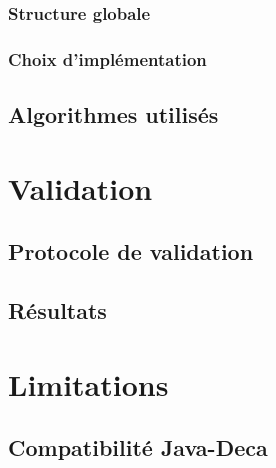 \documentclass[12pt, a4paper, one side]{article}
\begin{document}
    \subsubsection{Structure globale}
    \subsubsection{Choix d'implémentation}
    \subsection{Algorithmes utilisés}

    \section{Validation}
    \subsection{Protocole de validation}
    \subsection{Résultats}

    \section{Limitations}
    \subsection{Compatibilité Java-Deca}

    \printbibliography
\end{document}
